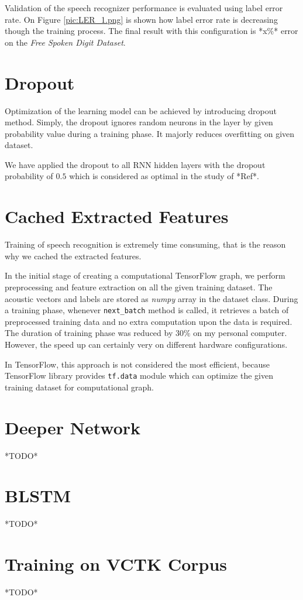 
Validation of the speech recognizer performance is evaluated using label error rate.
On Figure \ref{pic:LER_1.png} is shown how label error rate is decreasing though the training process.
The final result with this configuration is *x\%* error on the \textit{Free Spoken Digit Dataset}.

\section{Dropout}

Optimization of the learning model can be achieved by introducing dropout method.
Simply, the dropout ignores random neurons in the layer by given probability value during a training phase.
It majorly reduces overfitting on given dataset.

We have applied the dropout to all RNN hidden layers with the dropout probability of $0.5$ which is considered as optimal in the study of *Ref*.

\section{Cached Extracted Features}

Training of speech recognition is extremely time consuming, that is the reason why we cached the extracted features.

In the initial stage of creating a computational TensorFlow graph, we perform preprocessing and feature extraction on all the given training dataset.
The acoustic vectors and labels are stored as \textit{numpy} array in the dataset class.
During a training phase, whenever \texttt{next\_batch} method is called, it retrieves a batch of preprocessed training data and no extra computation upon the data is required.
The duration of training phase was reduced by $30\%$ on my personal computer. However, the speed up can certainly very on different hardware configurations.

In TensorFlow, this approach is not considered the most efficient, because TensorFlow library provides \texttt{tf.data} module which can optimize the given training dataset for computational graph.

\section{Deeper Network}

*TODO*

\section{BLSTM}

*TODO*

\section{Training on VCTK Corpus}

*TODO*
